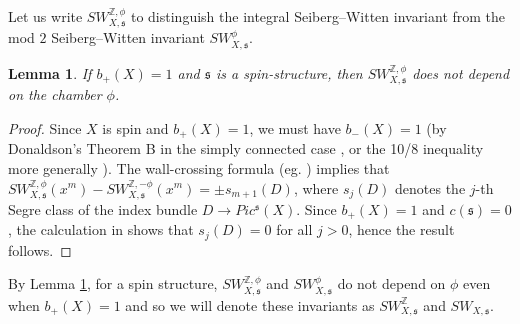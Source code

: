 \documentclass{amsart}
\newtheorem{lemma}[theorem]{Lemma}
\theoremstyle{definition}
\theoremstyle{remark}
\numberwithin{equation}{section}
\begin{document}
Let us write $SW_{X,\mathfrak{s}}^{\mathbb{Z},\phi}$ to distinguish the integral Seiberg--Witten invariant from the mod $2$ Seiberg--Witten invariant $SW^\phi_{X,\mathfrak{s}}$.

\begin{lemma}\label{lem:wcf1}
If $b_+(X) = 1$ and $\mathfrak{s}$ is a spin-structure, then $SW_{X,\mathfrak{s}}^{\mathbb{Z},\phi}$ does not depend on the chamber $\phi$.
\end{lemma}
\begin{proof}
Since $X$ is spin and $b_+(X)=1$, we must have $b_-(X)=1$ (by Donaldson's Theorem B in the simply connected case \cite{don}, or the 10/8 inequality more generally \cite{fur}). The wall-crossing formula (eg. \cite{bk}) implies that $SW_{X,\mathfrak{s}}^{\mathbb{Z},\phi}(x^m) - SW_{X,\mathfrak{s}}^{\mathbb{Z},-\phi}(x^m) = \pm s_{m+1}(D)$, where $s_j(D)$ denotes the $j$-th Segre class of the index bundle $D \to Pic^{\mathfrak{s}}(X)$. Since $b_+(X)=1$ and $c(\mathfrak{s}) = 0$, the calculation in \cite[]{bk} shows that $s_j(D) = 0$ for all $j > 0$, hence the result follows.
\end{proof}

By Lemma \ref{lem:wcf1}, for a spin structure, $SW_{X,\mathfrak{s}}^{\mathbb{Z},\phi}$ and $SW_{X,\mathfrak{s}}^{\phi}$ do not depend on $\phi$ even when $b_+(X)=1$ and so we will denote these invariants as $SW_{X,\mathfrak{s}}^{\mathbb{Z}}$ and $SW_{X,\mathfrak{s}}$.
\end{document}
